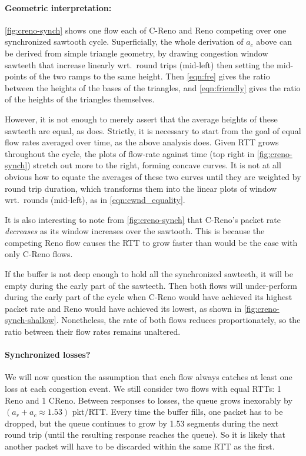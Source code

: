 \paragraph{Geometric interpretation:} \autoref{fig:creno-synch} shows one flow each of C-Reno and Reno competing over one synchronized sawtooth cycle. Superficially, the whole derivation of \(a_c\) above can be derived from simple triangle geometry, by drawing congestion window sawteeth that increase linearly wrt.\ round trips (mid-left) then setting the mid-points of the two ramps to the same height. Then \autoref{eqn:fre} gives the ratio between the heights of the bases of the triangles, and \autoref{eqn:friendly} gives the ratio of the heights of the triangles themselves.

However, it is not enough to merely assert that the average heights of these sawteeth are equal, as \cite{Floyd00:Eqn_v_AIMD_cc} does. Strictly, it is necessary to start from the goal of equal flow rates averaged over time, as the above analysis does. Given RTT grows throughout the cycle, the plots of flow-rate against time (top right in \autoref{fig:creno-synch}) stretch out more to the right, forming concave curves. It is not at all obvious how to equate the averages of these two curves until they are weighted by round trip duration, which transforms them into the linear plots of window wrt.\ rounds (mid-left), as in \autoref{eqn:cwnd_equality}.

It is also interesting to note from \autoref{fig:creno-synch} that C-Reno's packet rate \emph{decreases} as its window increases over the sawtooth. This is because the competing Reno flow causes the RTT to grow faster than would be the case with only C-Reno flows. 

If the buffer is not deep enough to hold all the synchronized sawteeth, it will be empty during the early part of the sawteeth. Then both flows will under-perform during the early part of the cycle when C-Reno would have achieved its highest packet rate and Reno would have achieved its lowest, as shown in \autoref{fig:creno-synch-shallow}. Nonetheless, the rate of both flows reduces proportionately, so the ratio between their flow rates remains unaltered.

\paragraph{Synchronized losses?} We will now question the assumption that each flow always catches at least one loss at each congestion event. We still consider two flows with equal RTTs: 1 Reno and 1 CReno. Between responses to losses, the queue grows inexorably by \((a_r + a_c \approx 1.53)\) pkt/RTT. Every time the buffer fills, one packet has to be dropped, but the queue continues to grow by 1.53 segments during the next round trip (until the resulting response reaches the queue). So it is likely that another packet will have to be discarded within the same RTT as the first.

